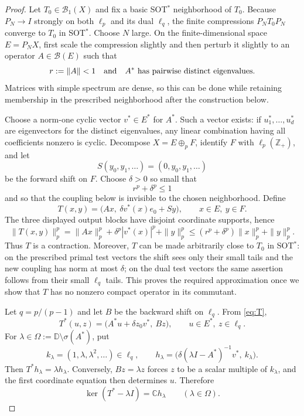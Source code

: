 \documentclass[11pt]{article}
\newcommand{\B}{\mathcal B}
\newcommand{\D}{\mathbb D}
\begin{document}
\begin{proof}
Let $T_0\in\B_1(X)$ and fix a basic SOT$^*$ neighborhood of $T_0$.
Because $P_N\to I$ strongly on both $\ell_p$ and its dual $\ell_q$, the
finite compressions $P_NT_0P_N$ converge to $T_0$ in SOT$^*$.  Choose $N$
large.  On the finite-dimensional space $E=P_NX$, first scale the
compression slightly and then perturb it slightly to an operator
$A\in\B(E)$ such that
\[
 r:=\|A\|<1
 \quad\hbox{and}\quad
 A^*\text{ has pairwise distinct eigenvalues}.
\]
Matrices with simple spectrum are dense, so this can be done while retaining
membership in the prescribed neighborhood after the construction below.

Choose a norm-one cyclic vector $v^*\in E^*$ for $A^*$.  Such a vector exists:
if $u_1^*,\dots,u_d^*$ are eigenvectors for the distinct eigenvalues, any
linear combination having all coefficients nonzero is cyclic.  Decompose
$X=E\oplus_p F$, identify $F$ with $\ell_p(\mathbb Z_+)$, and let
\[
 S(y_0,y_1,\dots)=(0,y_0,y_1,\dots)
\]
be the forward shift on $F$.  Choose $\delta>0$ so small that
\[
 r^p+\delta^p\leq1
\]
and so that the coupling below is invisible to the chosen neighborhood.
Define
\begin{equation}\label{eq:T}
 T(x,y)=\bigl(Ax,\ \delta v^*(x)e_0+Sy\bigr),
 \qquad x\in E,\ y\in F.
\end{equation}
The three displayed output blocks have disjoint coordinate supports, hence
\[
 \|T(x,y)\|_p^p
 =\|Ax\|_p^p+\delta^p|v^*(x)|^p+\|y\|_p^p
 \leq(r^p+\delta^p)\|x\|_p^p+\|y\|_p^p.
\]
Thus $T$ is a contraction.  Moreover, $T$ can be made arbitrarily close to
$T_0$ in SOT$^*$: on the prescribed primal test vectors the shift sees only
their small tails and the new coupling has norm at most $\delta$; on the dual
test vectors the same assertion follows from their small $\ell_q$ tails.
This proves the required approximation once we show that $T$ has no nonzero
compact operator in its commutant.

Let $q=p/(p-1)$ and let $B$ be the backward shift on $\ell_q$.  From
\eqref{eq:T},
\[
 T^*(u,z)=\bigl(A^*u+\delta z_0v^*,\ Bz\bigr),
 \qquad u\in E^*,\ z\in\ell_q.
\]
For $\lambda\in\Omega:=\D\setminus\sigma(A^*)$, put
\[
 k_\lambda=(1,\lambda,\lambda^2,\dots)\in\ell_q,
 \qquad
 h_\lambda=
 \bigl(\delta(\lambda I-A^*)^{-1}v^*,\ k_\lambda\bigr).
\]
Then $T^*h_\lambda=\lambda h_\lambda$.  Conversely,
$Bz=\lambda z$ forces $z$ to be a scalar multiple of $k_\lambda$, and the
first coordinate equation then determines $u$.  Therefore
\begin{equation}\label{eq:onedim}
 \ker(T^*-\lambda I)=\mathbb C h_\lambda
 \qquad(\lambda\in\Omega).
\end{equation}


\end{proof}
\end{document}
